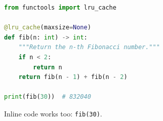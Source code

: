 \documentclass{article}
\begin{document}
\begin{lstlisting}[language=Python, caption={Fibonacci with memoisation.}]
from functools import lru_cache

@lru_cache(maxsize=None)
def fib(n: int) -> int:
    """Return the n-th Fibonacci number."""
    if n < 2:
        return n
    return fib(n - 1) + fib(n - 2)

print(fib(30))  # 832040
\end{lstlisting}
Inline code works too: \lstinline|fib(30)|.
\end{document}
